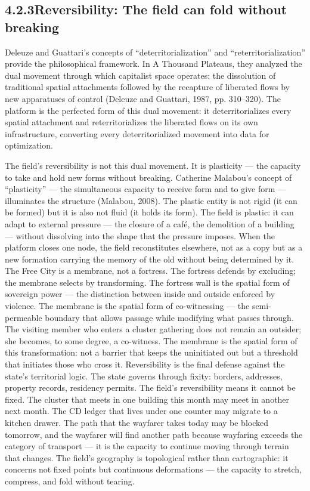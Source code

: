 \subsection{4.2.3\quad Reversibility: The field can fold without breaking}

Deleuze and Guattari’s concepts of “deterritorialization” and “reterritorialization” provide the philosophical framework. In A Thousand Plateaus, they analyzed the dual movement through which capitalist space operates: the dissolution of traditional spatial attachments followed by the recapture of liberated flows by new apparatuses of control (Deleuze and Guattari, 1987, pp. 310–320). The platform is the perfected form of this dual movement: it deterritorializes every spatial attachment and reterritorializes the liberated flows on its own infrastructure, converting every deterritorialized movement into data for optimization.

The field’s reversibility is not this dual movement. It is plasticity — the capacity to take and hold new forms without breaking. Catherine Malabou’s concept of “plasticity” — the simultaneous capacity to receive form and to give form — illuminates the structure (Malabou, 2008). The plastic entity is not rigid (it can be formed) but it is also not fluid (it holds its form). The field is plastic: it can adapt to external pressure — the closure of a café, the demolition of a building — without dissolving into the shape that the pressure imposes. When the platform closes one node, the field reconstitutes elsewhere, not as a copy but as a new formation carrying the memory of the old without being determined by it. The Free City is a membrane, not a fortress. The fortress defends by excluding; the membrane selects by transforming. The fortress wall is the spatial form of sovereign power — the distinction between inside and outside enforced by violence. The membrane is the spatial form of co-witnessing — the semi-permeable boundary that allows passage while modifying what passes through. The visiting member who enters a cluster gathering does not remain an outsider; she becomes, to some degree, a co-witness. The membrane is the spatial form of this transformation: not a barrier that keeps the uninitiated out but a threshold that initiates those who cross it. Reversibility is the final defense against the state’s territorial logic. The state governs through fixity: borders, addresses, property records, residency permits. The field’s reversibility means it cannot be fixed. The cluster that meets in one building this month may meet in another next month. The CD ledger that lives under one counter may migrate to a kitchen drawer. The path that the wayfarer takes today may be blocked tomorrow, and the wayfarer will find another path because wayfaring exceeds the category of transport — it is the capacity to continue moving through terrain that changes. The field’s geography is topological rather than cartographic: it concerns not fixed points but continuous deformations — the capacity to stretch, compress, and fold without tearing.

